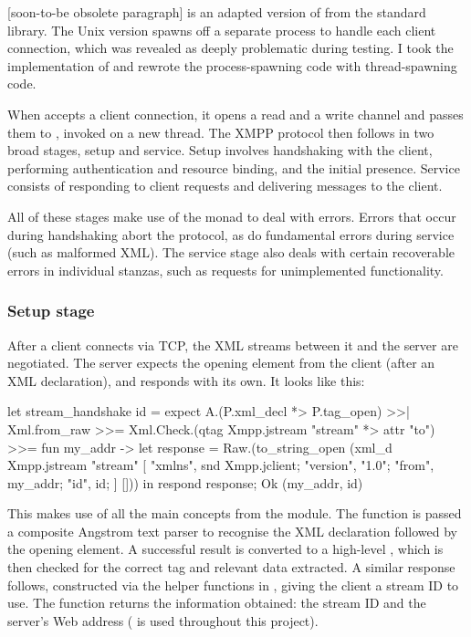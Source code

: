 [soon-to-be obsolete paragraph]
 is an adapted version of  from the standard library. The Unix version spawns off a separate process to handle each client connection, which was revealed as deeply problematic during testing. I took the implementation of  and rewrote the process-spawning code with thread-spawning code.

When  accepts a client connection, it opens a read and a write channel and passes them to , invoked on a new thread. The XMPP protocol then follows in two broad stages, setup and service. Setup involves handshaking with the client, performing authentication and resource binding, and the initial presence. Service consists of responding to client requests and delivering messages to the client.

All of these stages make use of the  monad to deal with errors. Errors that occur during handshaking abort the protocol, as do fundamental errors during service (such as malformed XML). The service stage also deals with certain recoverable errors in individual stanzas, such as requests for unimplemented functionality.

\subsubsection{Setup stage}\label{sec:server-setup}
After a client connects via TCP, the XML streams between it and the server are negotiated. The server expects the  opening element from the client (after an XML declaration), and responds with its own. It looks like this:

\begin{ocaml}
let stream_handshake id =
  expect A.(P.xml_decl *> P.tag_open) >>| Xml.from_raw >>=
    Xml.Check.(qtag Xmpp.jstream "stream" *> attr "to") >>= fun my_addr ->
  let response = Raw.(to_string_open (xml_d Xmpp.jstream "stream" [
    "xmlns", snd Xmpp.jclient;
    "version", "1.0"; "from", my_addr; "id", id;
  ] []))
  in respond response; Ok (my_addr, id)
\end{ocaml}

This makes use of all the main concepts from the  module. The  function is passed a composite Angstrom text parser to recognise the XML declaration followed by the opening  element. A successful result is converted to a high-level , which is then checked for the correct tag and relevant data extracted. A similar response follows, constructed via the helper functions in , giving the client a stream ID to use. The function returns the information obtained: the stream ID and the server's Web address ( is used throughout this project).

